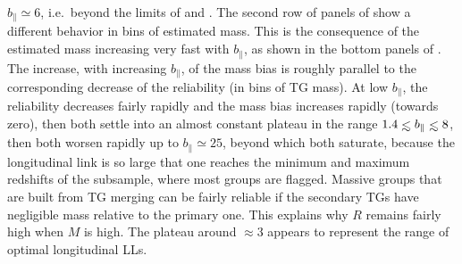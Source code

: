 $b_\parallel \simeq 6$, i.e.\ beyond the limits of
 and . The second
row of panels of  show a different behavior
in bins of estimated mass. This is the consequence of the estimated mass
increasing very fast with $b_\parallel$, as shown in the bottom panels of
. The increase, with increasing
$b_\parallel$, of the mass bias is roughly parallel to the corresponding
decrease of the reliability (in bins of TG mass). At low $b_\parallel$, the
reliability decreases fairly rapidly and the mass bias increases rapidly
(towards zero), then both settle into an almost constant plateau in the range
$1.4 \la b_\parallel \la 8$, then both worsen rapidly up to $b_\parallel\simeq
25$, beyond which both saturate, because the longitudinal link is so large that
one reaches the minimum and maximum redshifts of the subsample, where most
groups are flagged. Massive groups that are built from TG merging can be fairly
reliable if the secondary TGs have negligible mass relative to the primary one.
This explains why $R$ remains fairly high when $M$ is high. The plateau around
\bpar$\approx 3$ appears to represent the range of optimal longitudinal LLs.

